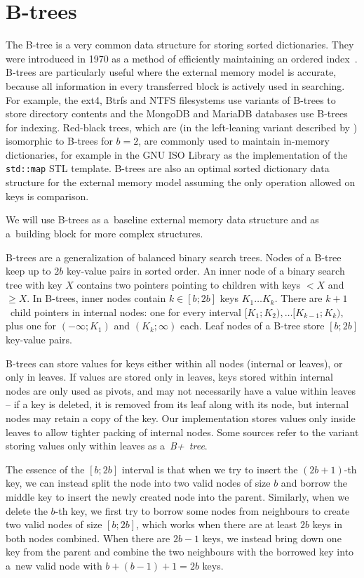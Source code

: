 \chapter{B-trees}
\label{chapter:btree}
The B-tree is a very common data structure for storing sorted dictionaries.
They were introduced in 1970 as a method of efficiently maintaining an ordered
index~\cite{btree}.
B-trees are particularly useful where the external memory model is accurate,
because all information in every transferred block is actively used
in searching. For example, the ext4, Btrfs and NTFS filesystems use variants
of B-trees to store directory contents and the MongoDB and MariaDB databases
use B-trees for indexing.  %
Red-black trees, which are (in the left-leaning variant
described by \cite{left-leaning}) isomorphic to B-trees for $b=2$, are
commonly used to maintain in-memory dictionaries, for example in the GNU ISO
\Cpp{} Library as the implementation of the \texttt{std::map} STL template.
B-trees are also an optimal sorted dictionary data structure
for the external memory model assuming the only operation allowed on
keys is comparison.

We will use B-trees as a~baseline external memory data structure and as
a~building block for more complex structures.

B-trees are a generalization of balanced binary search trees.
Nodes of a B-tree keep up to $2b$ key-value pairs in sorted order.
An inner node of a binary search tree with key $X$ contains two pointers
pointing to children with keys $< X$ and $\geq X$. In B-trees,
inner nodes contain $k\in[b;2b]$ keys $K_1\ldots K_k$. There are $k+1$~child
pointers in internal nodes: one for every interval
$[K_1;K_2),\ldots [K_{k-1};K_k)$, plus one for $(-\infty;K_1)$ and
$(K_k;\infty)$ each.
Leaf nodes of a B-tree store $[b;2b]$ key-value pairs.

B-trees can store values for keys either within all nodes (internal or leaves),
or only in leaves. If values are stored only in leaves, keys stored
within internal nodes are only used as pivots, and may not necessarily
have a value within leaves -- if a key is deleted, it is removed from its leaf
along with its node, but internal nodes may retain a copy of the key.
Our implementation stores values only inside leaves to allow tighter packing
of internal nodes.
Some sources refer to the variant storing values only within
leaves as a~\emph{B+~tree}.

The essence of the $[b;2b]$ interval is that when we try to insert
the $(2b+1)$-th key, we can instead split the node into two valid nodes of size
$b$ and borrow the middle key to insert the newly created node into the parent.
Similarly, when we delete the $b$-th key, we first try to borrow some nodes
from neighbours to create two valid nodes of size $[b;2b]$, which works when
there are at least $2b$ keys in both nodes combined.
When there are $2b-1$ keys, we instead bring down one key from the parent
and combine the two neighbours with the borrowed key into a~new valid node with
$b+(b-1)+1=2b$ keys.

